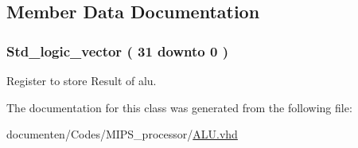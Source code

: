 \subsection{Member Data Documentation}
\hypertarget{class_a_l_u_1_1_behavioral_a97c0e91da4079e1bcdc77132d69c46b2}{
\subsubsection[{Result}]{ {\bfseries \textcolor{comment}{Std\-\_\-logic\-\_\-vector}\textcolor{vhdlchar}{ }\textcolor{vhdlchar}{(}\textcolor{vhdlchar}{ }\textcolor{vhdlchar}{ } \textcolor{vhdldigit}{31} \textcolor{vhdlchar}{ }\textcolor{vhdlchar}{ }\textcolor{vhdlchar}{ }\textcolor{vhdlkeyword}{downto}\textcolor{vhdlchar}{ }\textcolor{vhdlchar}{ }\textcolor{vhdlchar}{ } \textcolor{vhdldigit}{0} \textcolor{vhdlchar}{ }\textcolor{vhdlchar}{)}\textcolor{vhdlchar}{ }} \hspace{0.3cm}{\ttfamily [Shared Variable]}}}\label{class_a_l_u_1_1_behavioral_a97c0e91da4079e1bcdc77132d69c46b2}


Register to store Result of alu. 



The documentation for this class was generated from the following file\-:\begin{DoxyCompactItemize}
\item 
documenten/\-Codes/\-M\-I\-P\-S\-\_\-processor/\hyperlink{_a_l_u_8vhd}{A\-L\-U.\-vhd}\end{DoxyCompactItemize}
